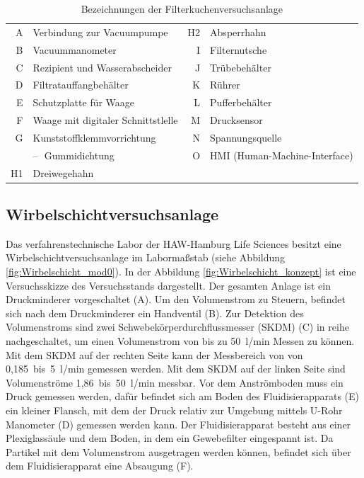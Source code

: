 \begin{table}[h!]
\centering
\caption{Bezeichnungen der Filterkuchenversuchsanlage}\label{tab:filterkuchenversuchsanlagenbezeichnungen}
\vspace{0.5em}
{\Hypatia \begin{tabular}{r l r l}
A & Verbindung zur Vacuumpumpe 				&  H2	& Absperrhahn	\\[0.1em]
B 	& Vacuummanometer 								& I	& Filternutsche 		\\[0.1em]  
C & Rezipient und Wasserabscheider \quad \quad	& J & Trübebehälter  \\[0.1em]
D	& Filtratauffangbehälter    							& K 	& Rührer 				\\[0.1em]	
E & Schutzplatte für Waage 							&  L & Pufferbehälter		\\[0.1em]
F 	& Waage mit digitaler Schnittstlelle 				& M & Drucksensor 		\\[0.1em]	
G & Kunststoffklemmvorrichtung									& N & Spannungsquelle \\[0.1em]	
 & --~\,Gummidichtung 									& O & HMI (Human-Machine-Interface)\\[0.1em]	
H1 &  	Dreiwegehahn									& 		& \\ 
\end{tabular}}
\end{table}



\newpage
\subsection{Wirbelschichtversuchsanlage}

Das verfahrenstechnische Labor der HAW-Hamburg Life Sciences besitzt eine Wirbelschichtversuchsanlage im Labormaßstab (siehe Abbildung \ref{fig:Wirbelschicht_mod0}). In der Abbildung \ref{fig:Wirbelschicht_konzept} ist eine Versuchsskizze des Versuchsstands dargestellt. Der gesamten Anlage ist ein Druckminderer vorgeschaltet ({\Hypatia A}). Um den Volumenstrom zu Steuern, befindet sich nach dem Druckminderer ein Handventil ({\Hypatia B}). Zur Detektion des Volumenstroms sind zwei Schwebekörperdurchflussmesser (SKDM) ({\Hypatia C}) in reihe nachgeschaltet, um einen Volumenstrom von bis zu 50~l/min Messen zu können. Mit dem SKDM auf der rechten Seite kann der Messbereich von von 0,185~bis~5~l/min gemessen werden. Mit dem SKDM auf der linken Seite sind Volumenströme 1,86~bis~50~l/min messbar. Vor dem Anströmboden muss ein Druck gemessen werden, dafür befindet sich am Boden des Fluidisierapparats ({\Hypatia E}) ein kleiner Flansch, mit dem der Druck relativ zur Umgebung mittels U-Rohr Manometer ({\Hypatia D}) gemessen werden kann. Der Fluidisierapparat besteht aus einer Plexiglassäule und dem Boden, in dem ein Gewebefilter eingespannt ist. Da Partikel mit dem Volumenstrom ausgetragen werden können, befindet sich über dem Fluidisierapparat eine Absaugung ({\Hypatia F}).

